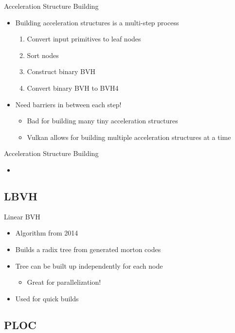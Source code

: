 \documentclass[aspectratio=169,t]{beamer}
\begin{document}
\begin{slide}{Acceleration Structure Building}
 \begin{itemize}
  \item Building acceleration structures is a multi-step process
  \begin{enumerate}
   \item Convert input primitives to leaf nodes
   \item Sort nodes
   \item Construct binary BVH
   \item Convert binary BVH to BVH4
  \end{enumerate}
  \item Need barriers in between each step!
  \begin{itemize}
   \item Bad for building many tiny acceleration structures
   \item Vulkan allows for building multiple acceleration structures at a time
  \end{itemize}
 \end{itemize}
\end{slide}

\begin{slide}{Acceleration Structure Building}
  \begin{itemize}
   \item
  \end{itemize}
\end{slide}

\subsection{LBVH}

\begin{slide}{Linear BVH}
  \begin{itemize}
   \item Algorithm from 2014
   \item Builds a radix tree from generated morton codes
   \item Tree can be built up independently for each node
   \begin{itemize}
    \item Great for parallelization!
   \end{itemize}
   \item Used for quick builds
  \end{itemize}
\end{slide}

\subsection{PLOC}
\end{document}
